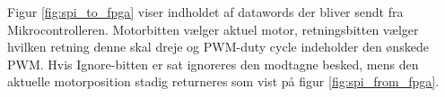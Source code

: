 Figur \ref{fig:spi_to_fpga} viser indholdet af datawords der bliver sendt fra Mikrocontrolleren. 
Motorbitten vælger aktuel motor, retningsbitten vælger hvilken retning
denne skal dreje og PWM-duty cycle indeholder den ønskede PWM. 
Hvis Ignore-bitten er sat ignoreres den modtagne besked,
mens den aktuelle motorposition stadig returneres som vist på figur \ref{fig:spi_from_fpga}. 

